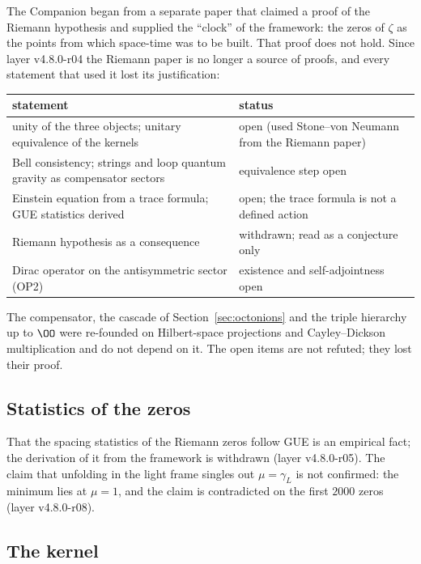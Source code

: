 The Companion began from a separate paper that claimed a proof of the Riemann hypothesis and supplied the ``clock'' of the
framework: the zeros of \(\zeta\) as the points from which space-time was to be built.  That proof does not hold.  Since layer
v4.8.0-r04 the Riemann paper is no longer a source of proofs, and every statement that used it lost its justification:
\begin{center}
\small
\begin{tabular}{@{}>{\raggedright\arraybackslash}p{}>{\raggedright\arraybackslash}p{}@{}}
\toprule
statement & status\\
\midrule
unity of the three objects; unitary equivalence of the kernels & open (used Stone--von Neumann from the Riemann paper)\\
Bell consistency; strings and loop quantum gravity as compensator sectors & equivalence step open\\
Einstein equation from a trace formula; GUE statistics derived & open; the trace formula is not a defined action\\
Riemann hypothesis as a consequence & withdrawn; read as a conjecture only\\
Dirac operator on the antisymmetric sector (OP2) & existence and self-adjointness open\\
\bottomrule
\end{tabular}
\end{center}
The compensator, the cascade of Section~\ref{sec:octonions} and the triple hierarchy up to \(\OO\) were re-founded on Hilbert-space
projections and Cayley--Dickson multiplication and do not depend on it.  The open items are not refuted; they lost their proof.

\subsection{Statistics of the zeros}

That the spacing statistics of the Riemann zeros follow GUE is an empirical fact; the derivation of it from the framework is withdrawn
(layer v4.8.0-r05).  The claim that unfolding in the light frame singles out \(\mu=\gamma_L\) is not confirmed: the minimum lies at
\(\mu=1\), and the claim is contradicted on the first \(2000\) zeros (layer v4.8.0-r08).

\subsection{The kernel}

